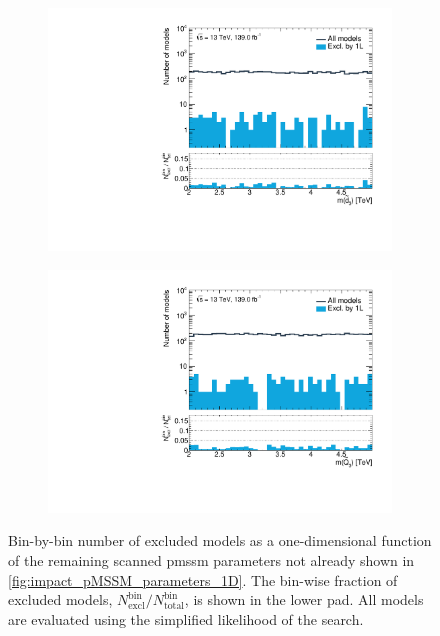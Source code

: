 \begin{figure}
\begin{subfigure}[b]{0.4\linewidth}
	\end{subfigure}
	\begin{subfigure}[b]{0.4\linewidth}
		\centering\includegraphics[width=\textwidth]{1D/mbR}
	\end{subfigure}
	\begin{subfigure}[b]{0.4\linewidth}
		\centering\includegraphics[width=\textwidth]{1D/mqL3}
	\end{subfigure}
	\caption{Bin-by-bin number of excluded models as a one-dimensional function of the remaining scanned \gls{pmssm} parameters not already shown in \cref{fig:impact_pMSSM_parameters_1D}. The bin-wise fraction of excluded models, $N^\mathrm{bin}_\mathrm{excl} / N^\mathrm{bin}_\mathrm{total}$, is shown in the lower pad. All models are evaluated using the simplified likelihood of the \onelepton search.}
	\label{fig:impact_pMSSM_parameters_1D_2}
\end{figure}

